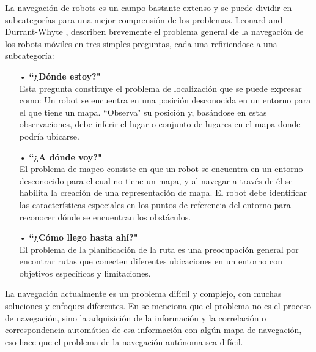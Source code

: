La navegación de robots es un campo bastante extenso y se puede dividir en subcategorías para una mejor comprensión de los problemas. Leonard and Durrant-Whyte \cite{leonard1991mobile}, describen brevemente el problema general de la navegación de los robots móviles en tres simples preguntas, cada una refiriendose a una subcategoría:
\begin{itemize}
\item[•] \textbf{``¿Dónde estoy?"}\\
Esta pregunta constituye el problema de localización que se puede expresar como: Un robot se encuentra en una posición desconocida en un entorno para el que tiene un mapa. ``Observa" su posición y, basándose en estas observaciones, debe inferir el lugar o conjunto de lugares en el mapa donde podría ubicarse.
\item[•] \textbf{``¿A dónde voy?"}\\
El problema de mapeo consiste en que un robot se encuentra en un entorno desconocido para el cual no tiene un mapa, y al navegar a través de él se habilita la creación de una representación de mapa. El robot debe identificar las características especiales en los puntos de referencia del entorno para reconocer dónde se encuentran los obstáculos.
\item[•] \textbf{``¿Cómo llego hasta ahí?"}\\
El problema de la planificación de la ruta es una preocupación general por encontrar rutas que conecten diferentes ubicaciones en un entorno con objetivos específicos y limitaciones.
\end{itemize}

La navegación actualmente es un problema difícil y complejo, con muchas soluciones y enfoques diferentes. En \cite{leonard1991mobile} se menciona que el problema no es el proceso de navegación, sino la adquisición de la información y la correlación o correspondencia automática de esa información con algún mapa de navegación, eso hace que el problema de la navegación autónoma sea difícil.


